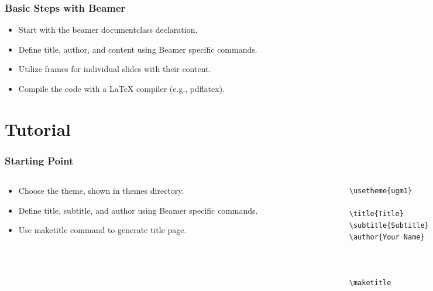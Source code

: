 {
\usebackgroundtemplate{\backgroundcontent}
\begin{frame}
  \frametitle{Basic Steps with Beamer}
  \begin{itemize}
    \item Start with the beamer documentclass declaration.
    \item Define title, author, and content using Beamer specific commands.
    \item Utilize frames for individual slides with their content.
    \item Compile the code with a LaTeX compiler (e.g., pdflatex).
  \end{itemize}
\end{frame}
}

\section{Tutorial}
\begin{frame}
    \sectionpage
\end{frame}

\begin{slide}
  \frametitle{Starting Point}
  \begin{columns}
    \begin{column}{.4\textwidth}
      \begin{itemize}
        \item Choose the theme, shown in themes directory.
        \item Define title, subtitle, and author using Beamer specific commands.
        \item Use maketitle command to generate title page.
      \end{itemize}
    \end{column}
    \begin{column}{.6\textwidth}
      \small
      \begin{verbatim}
\usetheme{ugm1}

\title{Title}
\subtitle{Subtitle}
\author{Your Name}



\maketitle
      \end{verbatim}
    \end{column}
  \end{columns}
\end{slide}


